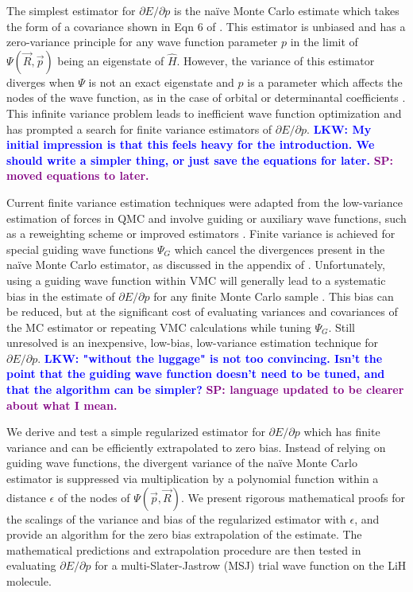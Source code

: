 \documentclass[twocolumn]{revtex4-1}
\newcommand{\lucas}[1]{\textbf{\textcolor{blue}{LKW: #1}}}
\newcommand{\shivesh}[1]{\textbf{\textcolor{purple}{SP: #1}}}
\begin{document}
The simplest estimator for $\partial E/\partial p$ is the na\"ive Monte Carlo estimate which takes the form of a covariance shown in Eqn 6 of \cite{Umrigar2005}.
This estimator is unbiased and has a zero-variance principle for any wave function parameter $p$ in the limit of $\Psi(\vec{R}, \vec{p})$ being an eigenstate of $\hat{H}$.
However, the variance of this estimator diverges when $\Psi$ is not an exact eigenstate and $p$ is a parameter which affects the nodes of the wave function, as in the case of orbital or determinantal coefficients \cite{Avella, doi:10.1063/1.4933112}.
This infinite variance problem leads to inefficient wave function optimization and has prompted a search for finite variance estimators of $\partial E/\partial p$.
\lucas{My initial impression is that this feels heavy for the introduction. We should write a simpler thing, or just save the equations for later.}
\shivesh{moved equations to later.}

Current finite variance estimation techniques were adapted from the low-variance estimation of forces in QMC \cite{doi:10.1063/1.462059, doi:10.1063/1.3516208, Phys2016} and involve guiding or auxiliary wave functions, such as a reweighting scheme \cite{Avella, Attaccalite2008, Zen2013} or improved estimators \cite{Assaraf1999, doi:10.1063/1.1286598, Assaraf2003}.
Finite variance is achieved for special guiding wave functions $\Psi_G$ which cancel the divergences present in the na\"ive Monte Carlo estimator, as discussed in the appendix of \cite{doi:10.1063/1.4933112}.
Unfortunately, using a guiding wave function within VMC will generally lead to a systematic bias in the estimate of $\partial E/\partial p$ for any finite Monte Carlo sample \cite{doi:10.1063/1.4933112, Toulouse2015}.
This bias can be reduced, but at the significant cost of evaluating variances and covariances of the MC estimator \cite{Toulouse2015} or repeating VMC calculations while tuning $\Psi_G$.
Still unresolved is an inexpensive, low-bias, low-variance estimation technique for $\partial E/\partial p$.
\lucas{"without the luggage" is not too convincing. Isn't the point that the guiding wave function doesn't need to be tuned, and that the algorithm can be simpler?}
\shivesh{language updated to be clearer about what I mean.}

We derive and test a simple regularized estimator for $\partial E/\partial p$ which has finite variance and can be efficiently extrapolated to zero bias.
Instead of relying on guiding wave functions, the divergent variance of the na\"ive Monte Carlo estimator is suppressed via multiplication by a polynomial function within a distance $\epsilon$ of the nodes of $\Psi(\vec{p}, \vec{R})$. 
We present rigorous mathematical proofs for the scalings of the variance and bias of the regularized estimator with $\epsilon$, and provide an algorithm for the zero bias extrapolation of the estimate.
The mathematical predictions and extrapolation procedure are then tested in evaluating $\partial E/\partial p$ for a multi-Slater-Jastrow (MSJ) trial wave function on the LiH molecule.
\end{document}

